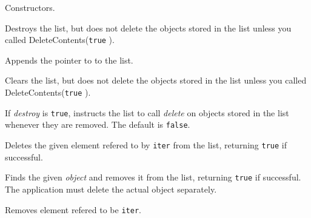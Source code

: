 
Constructors.

\label{wxlistdtor}


Destroys the list, but does not delete the objects stored in the list
unless you called DeleteContents({\tt true} ).

\label{wxlistappend}


Appends the pointer to  to the list.

\label{wxlistclear}


Clears the list, but does not delete the objects stored in the list
unless you called DeleteContents({\tt true} ).

\label{wxlistdeletecontents}


If {\it destroy} is {\tt true}, instructs the list to call {\it delete}
on objects stored in the list whenever they are removed.
The default is {\tt false}.

\label{wxlistdeletenode}


Deletes the given element refered to by {\tt iter} from the list, 
returning {\tt true} if successful.

\label{wxlistdeleteobject}


Finds the given {\it object} and removes it from the list, returning
{\tt true} if successful. The application must delete the actual object
separately.

\label{wxlisterase}


Removes element refered to be {\tt iter}.

\label{wxlistfind}

